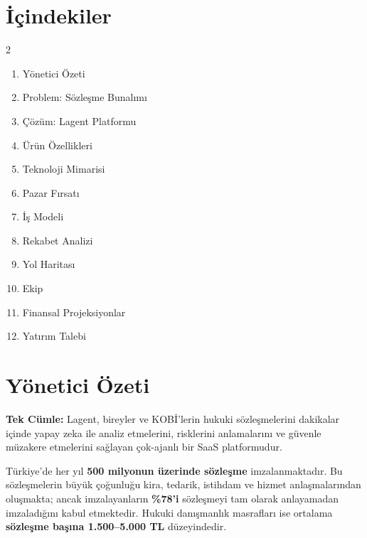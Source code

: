 \documentclass[12pt,a4paper]{article}
\begin{document}
\section*{İçindekiler}
\begin{multicols}{2}
\begin{enumerate}[leftmargin=*, label=\textbf{\arabic*.}]
  \item Yönetici Özeti
  \item Problem: Sözleşme Bunalımı
  \item Çözüm: Lagent Platformu
  \item Ürün Özellikleri
  \item Teknoloji Mimarisi
  \item Pazar Fırsatı
  \item İş Modeli
  \item Rekabet Analizi
  \item Yol Haritası
  \item Ekip
  \item Finansal Projeksiyonlar
  \item Yatırım Talebi
\end{enumerate}
\end{multicols}

\newpage

\section{Yönetici Özeti}

\begin{highlightbox}
\textbf{\color{primary}Tek Cümle:} Lagent, bireyler ve KOBİ'lerin hukuki sözleşmelerini dakikalar
içinde yapay zeka ile analiz etmelerini, risklerini anlamalarını ve güvenle müzakere etmelerini
sağlayan çok-ajanlı bir SaaS platformudur.
\end{highlightbox}

\vspace{0.5em}

Türkiye'de her yıl \textbf{500 milyonun üzerinde sözleşme} imzalanmaktadır. Bu sözleşmelerin büyük
çoğunluğu kira, tedarik, istihdam ve hizmet anlaşmalarından oluşmakta; ancak imzalayanların
\textbf{\%78'i} sözleşmeyi tam olarak anlayamadan imzaladığını kabul etmektedir. Hukuki danışmanlık
masrafları ise ortalama \textbf{sözleşme başına 1.500–5.000 TL} düzeyindedir.
\end{document}
